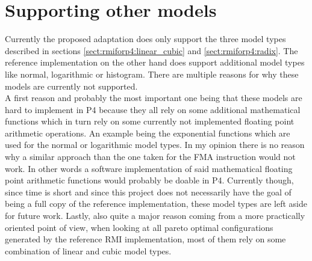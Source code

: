 \section{Supporting other models}
Currently the proposed adaptation does only support the three model types described in sections \ref{sect:rmiforp4:linear_cubic} and \ref{sect:rmiforp4:radix}. The reference implementation on the other hand does support additional model types like normal, logarithmic or histogram. There are multiple reasons for why these models are currently not supported.\\

A first reason and probably the most important one being that these models are hard to implement in P4 because they all rely on some additional mathematical functions which in turn rely on some currently not implemented floating point arithmetic operations. An example being the exponential functions which are used for the normal or logarithmic model types. In my opinion there is no reason why a similar approach than the one taken for the FMA instruction would not work. In other words a software implementation of said mathematical floating point arithmetic functions would probably be doable in P4. Currently though, since time is short and since this project does not necessarily have the goal of being a full copy of the reference implementation, these model types are left aside for future work. Lastly, also quite a major reason coming from a more practically oriented point of view, when looking at all pareto optimal configurations generated by the reference RMI implementation, most of them rely on some combination of linear and cubic model types.
